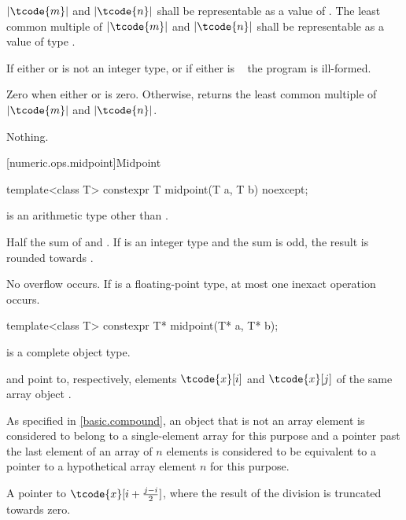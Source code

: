\begin{itemdescr}
\pnum
\requires
$|\tcode{m}|$ and $|\tcode{n}|$
shall be representable as a value of .
The least common multiple of $|\tcode{m}|$ and $|\tcode{n}|$
shall be representable as a value of type .

\pnum
\remarks
If either  or  is not an integer type, or
if either is \cv{}~ the program is ill-formed.

\pnum
\returns
Zero when either  or  is zero.
Otherwise, returns the least common multiple of $|\tcode{m}|$ and $|\tcode{n}|$.

\pnum
\throws
Nothing.
\end{itemdescr}

[numeric.ops.midpoint]{Midpoint}

%
\begin{itemdecl}
template<class T>
  constexpr T midpoint(T a, T b) noexcept;
\end{itemdecl}
\begin{itemdescr}
\pnum
\constraints
{} is an arithmetic type other than .

\pnum
\returns
Half the sum of  and .
If  is an integer type and the sum is odd,
the result is rounded towards .

\pnum
\remarks
No overflow occurs.
If  is a floating-point type, at most one inexact operation occurs.
\end{itemdescr}

%
\begin{itemdecl}
template<class T>
  constexpr T* midpoint(T* a, T* b);
\end{itemdecl}
\begin{itemdescr}
\pnum
\constraints
{} is a complete object type.

\pnum
\expects
{} and  point to, respectively,
elements $\tcode{x}[i]$ and $\tcode{x}[j]$ of the same array object .
\begin{note}
As specified in \ref{basic.compound},
an object that is not an array element
is considered to belong to a single-element array for this purpose and
a pointer past the last element of an array  of $n$ elements
is considered to be equivalent to a pointer
to a hypothetical array element $n$ for this purpose.
\end{note}

\pnum
\returns
A pointer to $\tcode{x}[i+\frac{j-i}{2}]$,
where the result of the division is truncated towards zero.
\end{itemdescr}

